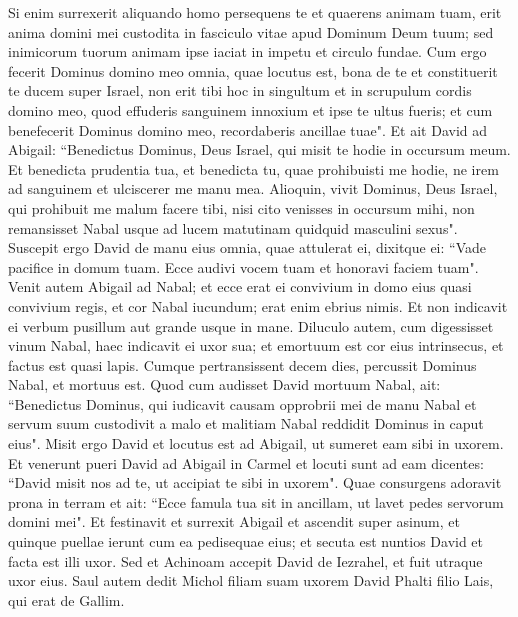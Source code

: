\begin{biblechapter}
\verse Si enim surrexerit aliquando homo persequens te et quaerens animam tuam, erit anima domini mei custodita in fasciculo vitae apud Dominum Deum tuum; sed inimicorum tuorum animam ipse iaciat in impetu et circulo fundae. 
\verse Cum ergo fecerit Dominus domino meo omnia, quae locutus est, bona de te et constituerit te ducem super Israel, 
\verse non erit tibi hoc in singultum et in scrupulum cordis domino meo, quod effuderis sanguinem innoxium et ipse te ultus fueris; et cum benefecerit Dominus domino meo, recordaberis ancillae tuae". 
\verse Et ait David ad Abigail: “Benedictus Dominus, Deus Israel, qui misit te hodie in occursum meum. Et benedicta prudentia tua, 
\verse et benedicta tu, quae prohibuisti me hodie, ne irem ad sanguinem et ulciscerer me manu mea. 
\verse Alioquin, vivit Dominus, Deus Israel, qui prohibuit me malum facere tibi, nisi cito venisses in occursum mihi, non remansisset Nabal usque ad lucem matutinam quidquid masculini sexus". 
\verse Suscepit ergo David de manu eius omnia, quae attulerat ei, dixitque ei: “Vade pacifice in domum tuam. Ecce audivi vocem tuam et honoravi faciem tuam". 
\verse Venit autem Abigail ad Nabal; et ecce erat ei convivium in domo eius quasi convivium regis, et cor Nabal iucundum; erat enim ebrius nimis. Et non indicavit ei verbum pusillum aut grande usque in mane. 
\verse Diluculo autem, cum digessisset vinum Nabal, haec indicavit ei uxor sua; et emortuum est cor eius intrinsecus, et factus est quasi lapis. 
\verse Cumque pertransissent decem dies, percussit Dominus Nabal, et mortuus est. 
\verse Quod cum audisset David mortuum Nabal, ait: “Benedictus Dominus, qui iudicavit causam opprobrii mei de manu Nabal et servum suum custodivit a malo et malitiam Nabal reddidit Dominus in caput eius". Misit ergo David et locutus est ad Abigail, ut sumeret eam sibi in uxorem.  
\verse Et venerunt pueri David ad Abigail in Carmel et locuti sunt ad eam dicentes: “David misit nos ad te, ut accipiat te sibi in uxorem". 
\verse Quae consurgens adoravit prona in terram et ait: “Ecce famula tua sit in ancillam, ut lavet pedes servorum domini mei". 
\verse Et festinavit et surrexit Abigail et ascendit super asinum, et quinque puellae ierunt cum ea pedisequae eius; et secuta est nuntios David et facta est illi uxor. 
\verse Sed et Achinoam accepit David de Iezrahel, et fuit utraque uxor eius. 
\verse Saul autem dedit Michol filiam suam uxorem David Phalti filio Lais, qui erat de Gallim. 
\end{biblechapter}

